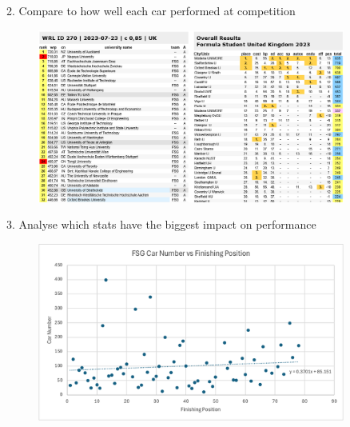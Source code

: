 \begin{frame}
    \begin{center}
        2. Compare to how well each car performed at competition
        \begin{figure}
            \includegraphics[width=0.9\textwidth]{res/FS World Ranking.png}
        \end{figure}
    \end{center}
\end{frame}

\begin{frame}
    \begin{center}
        3. Analyse which stats have the biggest impact on performance
        \begin{figure}
            \includegraphics[width=0.9\textwidth]{res/Car Number vs Finishing Position.png}
        \end{figure}
    \end{center}
\end{frame}


